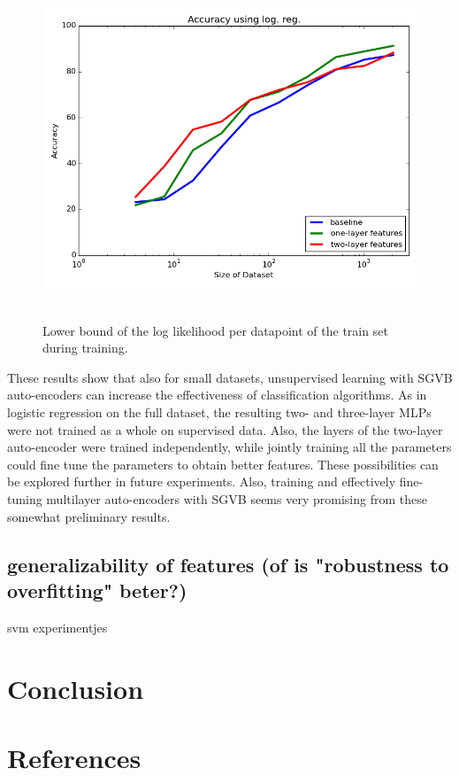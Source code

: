 \documentclass{article}
\begin{document}
\begin{figure}[htb]
\begin{center}
\includegraphics[height=4in,width=5in]{logreg_smallsets_report.png}
\caption{Lower bound of the log likelihood per datapoint of the train set during training.}
\end{center}
\end{figure}

These results show that also for small datasets, unsupervised learning with SGVB auto-encoders can increase the effectiveness of classification algorithms. As in logistic regression on the full dataset, the resulting two- and three-layer MLPs were not trained as a whole on supervised data. Also, the layers of the two-layer auto-encoder were trained independently, while jointly training all the parameters could fine tune the parameters to obtain better features. These possibilities can be explored further in future experiments. Also, training and effectively fine-tuning multilayer auto-encoders with SGVB seems very promising from these somewhat preliminary results. 

\subsection{generalizability of features (of is "robustness to overfitting" beter?)}

svm experimentjes

\section*{Conclusion}



\pagebreak 
\section*{References}


\end{document}
